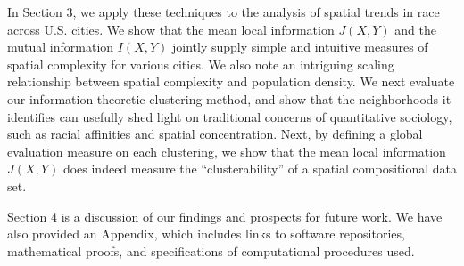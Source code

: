 	In Section 3, we apply these techniques to the analysis of spatial trends in race across U.S. cities. We show that the mean local information $J(X,Y)$ and the mutual information $I(X,Y)$ jointly supply simple and intuitive measures of spatial complexity for various cities. We also note an intriguing scaling relationship between spatial complexity and population density. We next evaluate our information-theoretic clustering method, and show that the neighborhoods it identifies can usefully shed light on traditional concerns of quantitative sociology, such as racial affinities and spatial concentration. Next, by defining a global evaluation measure on each clustering, we show that the mean local information $J(X,Y)$ does indeed measure the ``clusterability'' of a spatial compositional data set. 

	Section 4 is a discussion of our findings and prospects for future work. We have also provided an Appendix, which includes links to software repositories, mathematical proofs, and specifications of computational procedures used. 